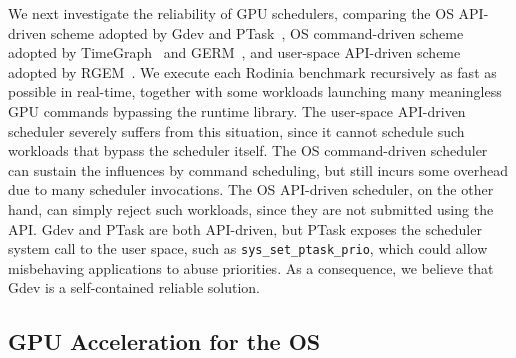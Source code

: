 We next investigate the reliability of GPU schedulers, comparing the OS
API-driven scheme adopted by Gdev and PTask~\cite{Rossbach_SOSP11}, OS
command-driven scheme adopted by TimeGraph~\cite{Kato_ATC11} and
GERM~\cite{Bautin_MCNC08}, and user-space API-driven scheme adopted by
RGEM~\cite{Kato_RTSS11}.
We execute each Rodinia benchmark recursively as fast as possible in
real-time, together with some workloads launching many meaningless GPU
commands bypassing the runtime library. 
The user-space API-driven scheduler severely suffers from this
situation, since it cannot schedule such workloads that bypass the
scheduler itself.
The OS command-driven scheduler can sustain the influences by command
scheduling, but still incurs some overhead due to many scheduler
invocations.
The OS API-driven scheduler, on the other hand, can simply reject such
workloads, since they are not submitted using the API.
Gdev and PTask are both API-driven, but PTask exposes the scheduler
system call to the user space, such as \texttt{sys\_set\_ptask\_prio},
which could allow misbehaving applications to abuse priorities.
As a consequence, we believe that Gdev is a self-contained reliable
solution.

\vspace{-0.25em}
\subsection{GPU Acceleration for the OS}
\vspace{-0.25em}

